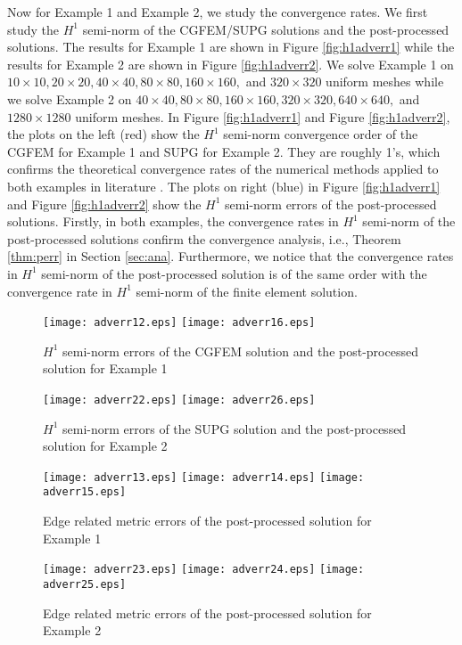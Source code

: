\documentclass[times]{nlaauth}
\numberwithin{equation}{section}
\begin{document}
Now for Example 1 and Example 2, we study the convergence rates. We first study the $H^1$ semi-norm of the CGFEM/SUPG solutions and the post-processed solutions. The results for Example 1 are shown in Figure \ref{fig:h1adverr1} while the results for Example 2 are shown in Figure \ref{fig:h1adverr2}. We solve Example 1 on $10\times 10, 20\times 20, 40\times 40, 80\times 80, 160\times  160,$ and $320\times 320$ uniform meshes while we solve Example 2  on $40\times 40, 80\times 80, 160\times  160,320\times 320, 640\times 640,$ and $1280\times 1280$ uniform meshes. In Figure \ref{fig:h1adverr1} and Figure \ref{fig:h1adverr2}, the plots on the left (red) show the $H^1$ semi-norm convergence order of the CGFEM for Example 1 and SUPG for Example 2. They are roughly 1's, which confirms the theoretical convergence rates of the numerical methods applied to both examples in literature \cite{brenner2008mathematical, johnson1984finite, roos2008robust}. The plots on right (blue) in Figure \ref{fig:h1adverr1} and Figure \ref{fig:h1adverr2} show the $H^1$ semi-norm errors of the post-processed solutions. Firstly, in both examples, the convergence rates in $H^1$ semi-norm of the post-processed solutions confirm the convergence analysis, i.e., Theorem \ref{thm:perr} in Section \ref{sec:ana}. Furthermore, we notice that the convergence rates in $H^1$ semi-norm of the post-processed solution is of the same order with the convergence rate in $H^1$ semi-norm of the finite element solution.

\begin{figure} 
\centering
\texttt{[image: adverr12.eps]}
\texttt{[image: adverr16.eps]}
\caption{$H^1$ semi-norm errors of the CGFEM solution and the post-processed solution for Example 1}
\label{fig:h1adverr1}
\texttt{[image: adverr22.eps]}
\texttt{[image: adverr26.eps]}
\caption{$H^1$ semi-norm errors of the SUPG solution and the post-processed solution for Example 2}
\label{fig:h1adverr2}
\texttt{[image: adverr13.eps]}
\texttt{[image: adverr14.eps]}
\texttt{[image: adverr15.eps]}
\caption{Edge related metric errors of the post-processed solution for Example 1}
\label{fig:emadverr1}
\texttt{[image: adverr23.eps]}
\texttt{[image: adverr24.eps]}
\texttt{[image: adverr25.eps]}
\caption{Edge related metric errors of the post-processed solution for Example 2}
\label{fig:emadverr2}
\end{figure}
\end{document}
